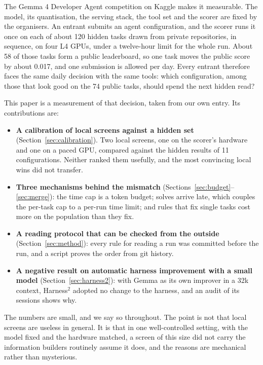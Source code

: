 \documentclass[11pt]{article}
\begin{document}
The Gemma 4 Developer Agent competition on Kaggle \citep{kaggle2026gemma4} makes it measurable. The model, its quantisation,
the serving stack, the tool set and the scorer are fixed by the organisers. An entrant submits an agent configuration, and
the scorer runs it once on each of about 120 hidden tasks drawn from private repositories, in sequence, on four L4 GPUs, under
a twelve-hour limit for the whole run. About 58 of those tasks form a public leaderboard, so one task moves the public score
by about 0.017, and one submission is allowed per day. Every entrant therefore faces the same daily decision with the same
tools: which configuration, among those that look good on the 74 public tasks, should spend the next hidden read?

This paper is a measurement of that decision, taken from our own entry. Its contributions are:

\begin{itemize}
\item \textbf{A calibration of local screens against a hidden set} (Section~\ref{sec:calibration}). Two local screens, one on
the scorer's hardware and one on a paced GPU, compared against the hidden results of 11 configurations. Neither ranked them usefully,
and the most convincing local wins did not transfer.
\item \textbf{Three mechanisms behind the mismatch} (Sections~\ref{sec:budget}--\ref{sec:merge}): the time cap is a token
budget; solves arrive late, which couples the per-task cap to a per-run time limit; and rules that fix single tasks cost more
on the population than they fix.
\item \textbf{A reading protocol that can be checked from the outside} (Section~\ref{sec:method}): every rule for reading a
run was committed before the run, and a script proves the order from git history.
\item \textbf{A negative result on automatic harness improvement with a small model} (Section~\ref{sec:harness2}): with
Gemma as its own improver in a 32k context, Harness$^2$ \citep{xu2026harness2} adopted no change to the harness, and an audit of
its sessions shows why.
\end{itemize}

The numbers are small, and we say so throughout. The point is not that local screens are useless in general. It is that in
one well-controlled setting, with the model fixed and the hardware matched, a screen of this size did not carry the
information builders routinely assume it does, and the reasons are mechanical rather than mysterious.
\end{document}
